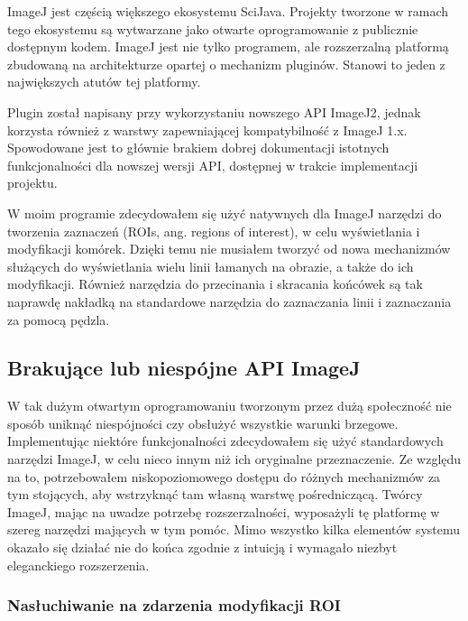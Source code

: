 \documentclass[declaration,shortabstract,mgr]{iithesis}
\begin{document}
ImageJ jest częścią większego ekosystemu SciJava.
Projekty tworzone w ramach tego ekosystemu są wytwarzane jako otwarte oprogramowanie z publicznie dostępnym kodem.
ImageJ jest nie tylko programem, ale rozszerzalną platformą zbudowaną na architekturze opartej o mechanizm pluginów.
Stanowi to jeden z największych atutów tej platformy\cite{imagej:philosophy}.

Plugin został napisany przy wykorzystaniu nowszego API ImageJ2, jednak korzysta również z warstwy zapewniającej kompatybilność z ImageJ 1.x.
Spowodowane jest to głównie brakiem dobrej dokumentacji istotnych funkcjonalności dla nowszej wersji API, dostępnej w trakcie implementacji projektu.

W moim programie zdecydowałem się użyć natywnych dla ImageJ narzędzi do tworzenia zaznaczeń (ROIs, ang. regions of interest), w celu wyświetlania i modyfikacji komórek.
Dzięki temu nie musiałem tworzyć od nowa mechanizmów służących do wyświetlania wielu linii łamanych na obrazie, a także do ich modyfikacji.
Również narzędzia do przecinania i skracania końcówek są tak naprawdę nakładką na standardowe narzędzia do zaznaczania linii i zaznaczania za pomocą pędzla.

\subsection{Brakujące lub niespójne API ImageJ}

W tak dużym otwartym oprogramowaniu tworzonym przez dużą społeczność nie sposób uniknąć niespójności czy obsłużyć wszystkie warunki brzegowe.
Implementując niektóre funkcjonalności zdecydowałem się użyć standardowych narzędzi ImageJ, w celu nieco innym niż ich oryginalne przeznaczenie.
Ze względu na to, potrzebowałem niskopoziomowego dostępu do różnych mechanizmów za tym stojących, aby wstrzyknąć tam własną warstwę pośredniczącą.
Twórcy ImageJ, mając na uwadze potrzebę rozszerzalności, wyposażyli tę platformę w szereg narzędzi mających w tym pomóc.
Mimo wszystko kilka elementów systemu okazało się działać nie do końca zgodnie z intuicją i wymagało niezbyt eleganckiego rozszerzenia.

\subsubsection{Nasłuchiwanie na zdarzenia modyfikacji ROI}
\end{document}
